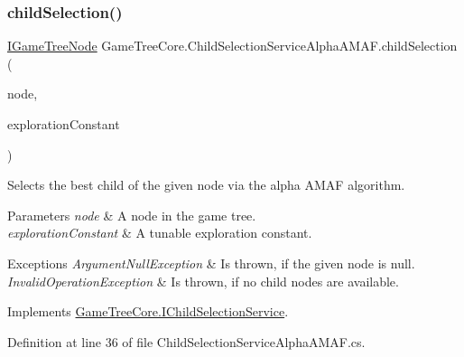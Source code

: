 \subsubsection{\texorpdfstring{child\+Selection()}{childSelection()}}
{\footnotesize\ttfamily \mbox{\hyperlink{interface_game_tree_core_1_1_i_game_tree_node}{I\+Game\+Tree\+Node}} Game\+Tree\+Core.\+Child\+Selection\+Service\+Alpha\+A\+M\+A\+F.\+child\+Selection (\begin{DoxyParamCaption}\item[{\mbox{\hyperlink{interface_game_tree_core_1_1_i_game_tree_node}{I\+Game\+Tree\+Node}}}]{node,  }\item[{double}]{exploration\+Constant }\end{DoxyParamCaption})}



Selects the best child of the given node via the alpha A\+M\+AF algorithm. 


\begin{DoxyParams}{Parameters}
{\em node} & A node in the game tree.\\
\hline
{\em exploration\+Constant} & A tunable exploration constant.\\
\hline
\end{DoxyParams}

\begin{DoxyExceptions}{Exceptions}
{\em Argument\+Null\+Exception} & Is thrown, if the given node is null.\\
\hline
{\em Invalid\+Operation\+Exception} & Is thrown, if no child nodes are available.\\
\hline
\end{DoxyExceptions}


Implements \mbox{\hyperlink{interface_game_tree_core_1_1_i_child_selection_service}{Game\+Tree\+Core.\+I\+Child\+Selection\+Service}}.



Definition at line 36 of file Child\+Selection\+Service\+Alpha\+A\+M\+A\+F.\+cs.

\mbox{\label{class_game_tree_core_1_1_child_selection_service_alpha_a_m_a_f_a363afde50466810de65b08e58b96be8d}} 
